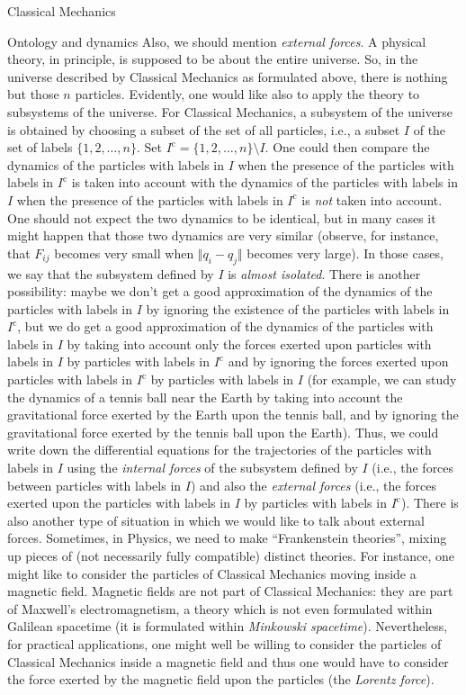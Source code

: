 \documentclass[oneside,a4paper,11pt]{amsbook}
\newcommand{\compl}{\mathrm c}
\theoremstyle{remark}\newtheorem{exercise}{Exercise}[chapter]
\theoremstyle{plain}\newtheorem{teo}{Theorem}[section]
\theoremstyle{plain}\newtheorem{lem}[teo]{Lemma}
\theoremstyle{plain}\newtheorem{prop}[teo]{Proposition}
\theoremstyle{plain}\newtheorem{cor}[teo]{Corollary}
\theoremstyle{definition}\newtheorem{defin}[teo]{Definition}
\theoremstyle{remark}\newtheorem{rem}[teo]{Remark}
\theoremstyle{definition}\newtheorem{notation}[teo]{Notation}
\theoremstyle{definition}\newtheorem{convention}[teo]{Convention}
\theoremstyle{definition}\newtheorem{example}[teo]{Example}
\numberwithin{section}{chapter}
\numberwithin{equation}{section}
\begin{document}
\begin{chapter}{Classical Mechanics}
\begin{section}{Ontology and dynamics}
Also, we should mention {\em external forces}. A physical theory, in principle, is supposed to be about the entire universe.
So, in the universe described by Classical Mechanics as formulated above, there is nothing but those $n$ particles.
Evidently, one would like also to apply the theory to subsystems of the universe. For Classical Mechanics, a subsystem
of the universe is obtained by choosing a subset of the set of all particles, i.e., a subset $I$ of the set of labels
$\{1,2,\ldots,n\}$. Set $I^\compl=\{1,2,\ldots,n\}\setminus I$. One could then compare the dynamics of the particles with labels in $I$
when the presence of the particles with labels in $I^\compl$ is taken into account with the dynamics of the particles
with labels in $I$ when the presence
of the particles with labels in $I^\compl$ is {\em not\/} taken into account. One should not expect
the two dynamics to be identical, but in many cases it might happen that those two dynamics are very similar (observe,
for instance, that $F_{ij}$ becomes very small when $\Vert q_i-q_j\Vert$ becomes very large).
In those cases, we say that the subsystem defined by $I$ is {\em almost isolated}.
There is another possibility: maybe we don't
get a good approximation of the dynamics of the particles with labels in $I$ by ignoring the existence of the particles
with labels in $I^\compl$, but we do get a good approximation of the dynamics of the particles with labels in $I$ by
taking into account only the forces exerted upon particles with labels in $I$ by particles with labels in $I^\compl$ and
by ignoring the forces exerted upon particles with labels in $I^\compl$ by particles with labels in $I$ (for example,
we can study the dynamics of a tennis ball near the Earth by taking into account the gravitational force exerted by the
Earth upon the tennis ball, and by ignoring the gravitational force exerted by the tennis ball upon the Earth).
Thus, we could write down the differential equations for the trajectories of the particles with labels in $I$ using
the {\em internal forces\/} of the subsystem defined by $I$ (i.e., the forces between particles with labels in $I$)
and also the {\em external forces\/} (i.e., the forces exerted upon the particles with labels in $I$ by particles
with labels in $I^\compl$). There is also another type of situation in which we would like to talk about external forces.
Sometimes, in Physics, we need to make ``Frankenstein theories'', mixing up pieces of (not
necessarily fully compatible) distinct theories. For instance, one might like to consider the particles of Classical Mechanics
moving inside a magnetic field. Magnetic fields are not part of Classical Mechanics: they are part of Maxwell's electromagnetism,
a theory which is not even formulated within Galilean spacetime (it is formulated within {\em Minkowski spacetime}).
Nevertheless, for practical applications, one might well be willing to consider the particles of Classical Mechanics
inside a magnetic field and thus one would have to consider the force exerted by the magnetic field upon the particles
(the {\em Lorentz force}).


\end{section}
\end{chapter}
\end{document}
